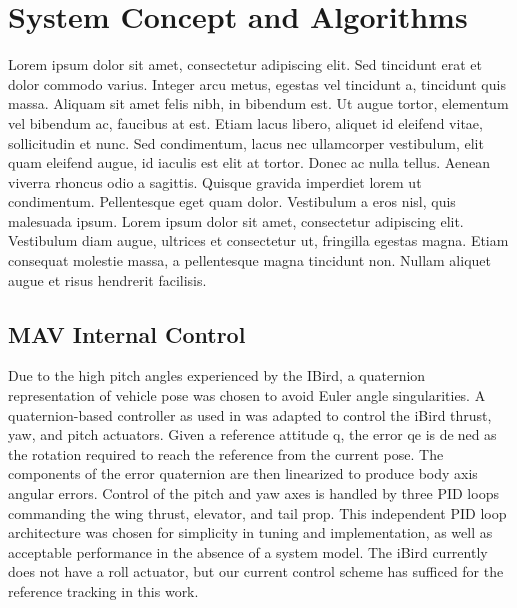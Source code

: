 \documentclass[letterpaper, 10 pt, conference]{ieeeconf}
\begin{document}
\section{System Concept and Algorithms}
Lorem ipsum dolor sit amet, consectetur adipiscing elit. Sed tincidunt erat et dolor commodo varius. Integer arcu metus, egestas vel tincidunt a, tincidunt quis massa. Aliquam sit amet felis nibh, in bibendum est. Ut augue tortor, elementum vel bibendum ac, faucibus at est. Etiam lacus libero, aliquet id eleifend vitae, sollicitudin et nunc. Sed condimentum, lacus nec ullamcorper vestibulum, elit quam eleifend augue, id iaculis est elit at tortor. Donec ac nulla tellus. Aenean viverra rhoncus odio a sagittis. Quisque gravida imperdiet lorem ut condimentum. Pellentesque eget quam dolor. Vestibulum a eros nisl, quis malesuada ipsum. Lorem ipsum dolor sit amet, consectetur adipiscing elit. Vestibulum diam augue, ultrices et consectetur ut, fringilla egestas magna. Etiam consequat molestie massa, a pellentesque magna tincidunt non. Nullam aliquet augue et risus hendrerit facilisis.

\subsection{MAV Internal Control}
Due to the high pitch angles experienced by the IBird, a quaternion representation of vehicle pose was chosen to avoid Euler angle singularities. A quaternion-based controller as used in was adapted to control the iBird thrust, yaw, and pitch actuators. Given a reference attitude q, the error qe is dened as the rotation required to reach the reference from the current pose. The components of the error quaternion are then linearized to produce body axis angular errors. Control of the pitch and yaw axes is handled by three PID loops commanding the wing thrust, elevator, and tail prop. This independent PID loop architecture was chosen for simplicity in tuning and implementation, as well as acceptable performance in the absence of a system model. The iBird currently does not have a roll actuator, but our current control scheme has sufficed for the reference tracking in this work.

\end{document}
